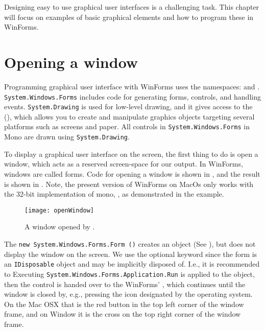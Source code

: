 Designing easy to use graphical user interfaces is a challenging task. This chapter will focus on examples of basic graphical elements and how to program these in WinForms.

\section{Opening a window}
Programming graphical user interface with WinForms uses the namespaces:  and . \lstinline{System.Windows.Forms} includes code for generating forms, controls, and handling events. \lstinline{System.Drawing} is used for low-level drawing, and it gives access to the  (), which allows you to create and manipulate graphics objects targeting several platforms such as screens and paper. All controls in \lstinline{System.Windows.Forms} in Mono are drawn using \lstinline{System.Drawing}. 

To display a graphical user interface on the screen, the first thing to do is open a window, which acts as a reserved screen-space for our output. In WinForms, windows are called forms. Code for opening a window is shown in , and the result is shown in . Note, the present version of WinForms on MacOs only works with the 32-bit implementation of mono, , as demonstrated in the example.
%
%
%
%
\begin{figure}
  \centering
  \texttt{[image: openWindow]}
  \caption{A window opened by .}
  \label{fig:openWindow}
\end{figure}
The \lstinline!new System.Windows.Forms.Form ()! creates an object (See ), but does not display the window on the screen. We use the optional  keyword since the form is an \lstinline{IDisposable} object and may be implicitly disposed of. I.e., it is recommended to  Executing \lstinline!System.Windows.Forms.Application.Run! is applied to the object, then the control is handed over to the WinForms' , which continues until the window is closed by, e.g., pressing the icon designated by the operating system. On the Mac OSX that is the red button in the top left corner of the window frame, and on Window it is the cross on the top right corner of the window frame.

